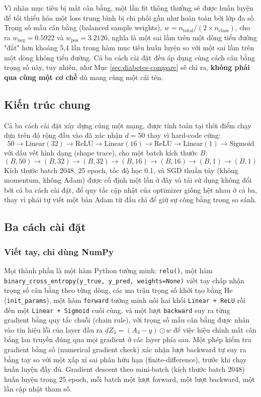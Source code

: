 \documentclass[11pt]{article}
\newcommand{\code}[1]{\texttt{#1}}
\begin{document}
Vì nhãn mục tiêu bị mất cân bằng, một lần fit thông thường sẽ được huấn
luyện để tối thiểu hóa một loss trung bình bị chi phối gần như hoàn toàn
bởi lớp đa số. Trọng số mẫu cân bằng (balanced sample weights),
$w = n_{\text{total}} / (2 \times n_{\text{class}})$, cho ra
$w_{\text{neg}} = 0.5922$ và $w_{\text{pos}} = 3.2126$, nghĩa là một sai
lầm trên một dòng tiểu đường "đắt" hơn khoảng 5,4 lần trong hàm mục tiêu
huấn luyện so với một sai lầm trên một dòng không tiểu đường. Cả ba cách
cài đặt đều áp dụng cùng cách cân bằng trọng số này, tuy nhiên, như Mục
\ref{sec:diabetes-compare} sẽ chỉ ra, \textbf{không phải qua cùng một cơ
chế} dù mang cùng một cái tên.

\subsection{Kiến trúc chung}

Cả ba cách cài đặt xây dựng cùng một mạng, được tính toán tại thời điểm
chạy dựa trên độ rộng đầu vào đã xác nhận $d = 50$ thay vì hard-code cứng:
\[
50 \to \text{Linear}(32) \to \text{ReLU} \to \text{Linear}(16) \to \text{ReLU}
\to \text{Linear}(1) \to \text{Sigmoid}
\]
với dấu vết hình dạng (shape trace), cho một batch kích thước $B$:
\[
(B, 50) \to (B, 32) \to (B, 32) \to (B, 16) \to (B, 16) \to (B, 1) \to (B, 1)
\]
Kích thước batch 2048, 25 epoch, tốc độ học 0.1, và SGD thuần túy (không
momentum, không Adam) được cố định một lần ở đây và tái sử dụng không đổi
bởi cả ba cách cài đặt, để quy tắc cập nhật của optimizer giống hệt nhau ở
cả ba, thay vì phải tự viết một bản Adam từ đầu chỉ để giữ sự công bằng
trong so sánh.

\subsection{Ba cách cài đặt}

\subsubsection{Viết tay, chỉ dùng NumPy}

Mọi thành phần là một hàm Python tường minh: \code{relu()}, một hàm
\code{binary\_cross\_entropy(y\_true, y\_pred, weights=None)} viết tay chấp
nhận trọng số cân bằng theo từng dòng, các ma trận trọng số khởi tạo bằng
He (\code{init\_params}), một hàm \code{forward} tường minh nối hai khối
\code{Linear + ReLU} rồi đến một \code{Linear + Sigmoid} cuối cùng, và một
lượt \code{backward} suy ra từng gradient bằng quy tắc chuỗi (chain rule),
với trọng số mẫu cân bằng được nhân vào tín hiệu lỗi của layer đầu ra
$dZ_3 = (A_3 - y) \odot w$ để việc hiệu chỉnh mất cân bằng lan truyền đúng
qua mọi gradient ở các layer phía sau. Một phép kiểm tra gradient bằng số
(numerical gradient check) xác nhận lượt backward tự suy ra bằng tay so
với một xấp xỉ sai phân hữu hạn (finite-difference), trước khi chạy huấn
luyện đầy đủ. Gradient descent theo mini-batch (kích thước batch 2048)
huấn luyện trong 25 epoch, mỗi batch một lượt forward, một lượt backward,
một lần cập nhật tham số.
\end{document}
